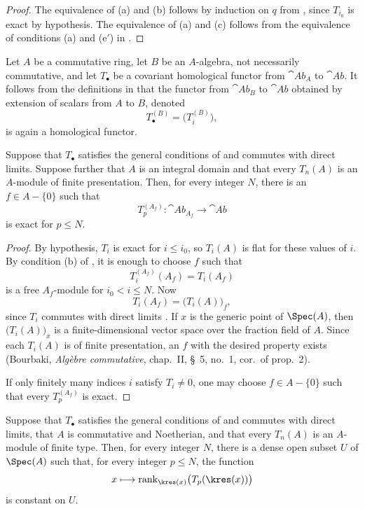 \begin{proof}
The equivalence of (a) and (b) follows by induction on $q$ from
, since $T_{i_0}$ is exact by hypothesis.  The
equivalence of (a) and (c) follows from the equivalence of
conditions (a) and ($\mathrm{e}'$) in .
\end{proof}

\begin{env}[7.3.8]
\label{III.7.3.8}
Let $A$ be a commutative ring, let $B$ be an $A$-algebra, not
necessarily commutative, and let $T_\bullet$ be a covariant
homological functor from $\cat{Ab}_A$ to $\cat{Ab}$.  It
follows from the definitions in  that the
functor from $\cat{Ab}_B$ to $\cat{Ab}$ obtained by extension
of scalars from $A$ to $B$, denoted
\[
  T_\bullet^{(B)}=\bigl(T_i^{(B)}\bigr),
\]
is again a homological functor.
\end{env}


\begin{corollary}[7.3.9]
\label{III.7.3.9}
Suppose that $T_\bullet$ satisfies the general conditions of
 and commutes with direct limits.  Suppose
further that $A$ is an integral domain and that every $T_n(A)$
is an $A$-module of finite presentation.  Then, for every
integer $N$, there is an $f\in A-\{0\}$ such that
\[
  T_p^{(A_f)}:\cat{Ab}_{A_f}\longrightarrow\cat{Ab}
\]
is exact for $p\leq N$.
\end{corollary}

\begin{proof}
By hypothesis, $T_i$ is exact for $i\leq i_0$, so $T_i(A)$ is
flat for these values of $i$.  By condition (b) of
, it is enough to choose $f$ such that
\[
  T_i^{(A_f)}(A_f)=T_i(A_f)
\]
is a free $A_f$-module for $i_0<i\leq N$.  Now
\[
  T_i(A_f)=\bigl(T_i(A)\bigr)_f,
\]
since $T_i$ commutes with direct limits .  If
$x$ is the generic point of $\Spec(A)$, then
$\bigl(T_i(A)\bigr)_x$ is a finite-dimensional vector space
over the fraction field of $A$.  Since each $T_i(A)$ is of
finite presentation, an $f$ with the desired property exists
(Bourbaki, \emph{Alg\`ebre commutative}, chap.~II, \S~5,
no.~1, cor.\ of prop.~2).

If only finitely many indices $i$ satisfy $T_i\neq0$, one may
choose $f\in A-\{0\}$ such that every $T_p^{(A_f)}$ is exact.
\end{proof}

\begin{corollary}[7.3.10]
\label{III.7.3.10}
Suppose that $T_\bullet$ satisfies the general conditions of
 and commutes with direct limits, that $A$ is
commutative and Noetherian, and that every $T_n(A)$ is an
$A$-module of finite type.  Then, for every integer $N$, there
is a dense open subset $U$ of $\Spec(A)$ such that, for every
integer $p\leq N$, the function
\[
  x\longmapsto
  \operatorname{rank}_{\kres(x)}
  \bigl(T_p(\kres(x))\bigr)
\]
is constant on $U$.
\end{corollary}

